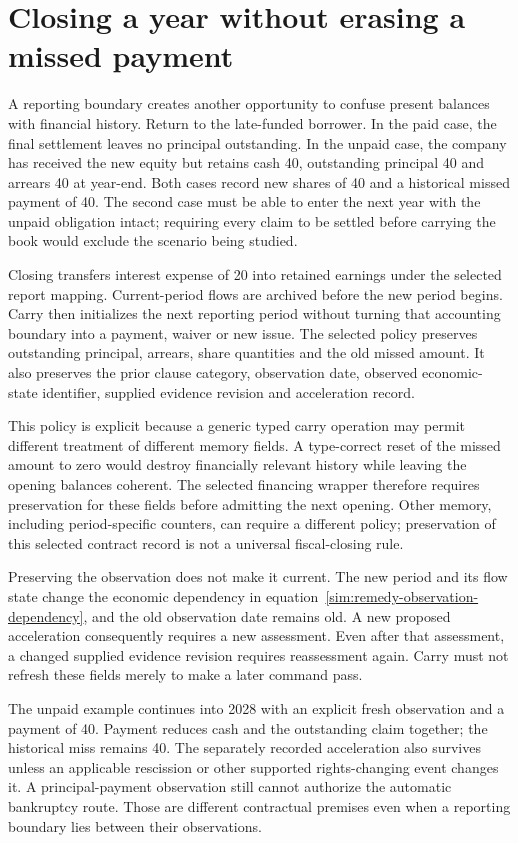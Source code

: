 
\section{Closing a year without erasing a missed payment}
\label{sim:financing-carry}
A reporting boundary creates another opportunity to confuse present balances
with financial history. Return to the late-funded borrower. In the paid case,
the final settlement leaves no principal outstanding. In the unpaid case,
the company has received the new equity but retains cash 40, outstanding
principal 40 and arrears 40 at year-end. Both cases record new shares of 40
and a historical missed payment of 40. The second case must be able to enter
the next year with the unpaid obligation intact; requiring every claim to be
settled before carrying the book would exclude the scenario being studied.

Closing transfers interest expense of 20 into retained earnings under the
selected report mapping. Current-period flows are archived before the new
period begins. Carry then initializes the next reporting period without
turning that accounting boundary into a payment, waiver or new issue. The
selected policy preserves outstanding principal, arrears, share quantities
and the old missed amount. It also preserves the prior clause category,
observation date, observed economic-state identifier, supplied evidence
revision and acceleration record.

This policy is explicit because a generic typed carry operation may permit
different treatment of different memory fields. A type-correct reset of the
missed amount to zero would destroy financially relevant history while leaving
the opening balances coherent. The selected financing wrapper therefore
requires preservation for these fields before admitting the next opening.
Other memory, including period-specific counters, can require a different
policy; preservation of this selected contract record is not a universal
fiscal-closing rule.

Preserving the observation does not make it current. The new period and its
flow state change the economic dependency in
equation~\eqref{sim:remedy-observation-dependency}, and the old observation date
remains old. A new proposed acceleration consequently requires a new
assessment. Even after that assessment, a changed supplied evidence revision
requires reassessment again. Carry must not refresh these fields merely to
make a later command pass.

The unpaid example continues into 2028 with an explicit fresh observation
and a payment of 40. Payment reduces cash and the outstanding claim together;
the historical miss remains 40. The separately recorded acceleration also
survives unless an applicable rescission or other supported rights-changing
event changes it. A principal-payment observation still cannot authorize the
automatic bankruptcy route. Those are different contractual premises even
when a reporting boundary lies between their observations.

